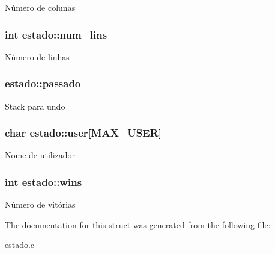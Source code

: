 Número de colunas \hypertarget{structestado_ab02e4fe5644c3b59088d7c4566d70105}{
\subsubsection[{num\+\_\+lins}]{\setlength{\rightskip}{0pt plus 5cm}int estado\+::num\+\_\+lins}}\label{structestado_ab02e4fe5644c3b59088d7c4566d70105}
Número de linhas \hypertarget{structestado_ada4a7610a6125feea84f1eeb0ae4fd1a}{
\subsubsection[{passado}]{ estado\+::passado}}\label{structestado_ada4a7610a6125feea84f1eeb0ae4fd1a}
Stack para undo \hypertarget{structestado_a256854b71f528cf0aafb9acb84fac759}{
\subsubsection[{user}]{\setlength{\rightskip}{0pt plus 5cm}char estado\+::user\mbox{[}{\bf M\+A\+X\+\_\+\+U\+S\+E\+R}\mbox{]}}}\label{structestado_a256854b71f528cf0aafb9acb84fac759}
Nome de utilizador \hypertarget{structestado_a87d1b6f5a4c37f8d9348c30bbf1f67cc}{
\subsubsection[{wins}]{\setlength{\rightskip}{0pt plus 5cm}int estado\+::wins}}\label{structestado_a87d1b6f5a4c37f8d9348c30bbf1f67cc}
Número de vitórias 

The documentation for this struct was generated from the following file\+:\begin{DoxyCompactItemize}
\item 
\hyperlink{estado_8c}{estado.\+c}\end{DoxyCompactItemize}
